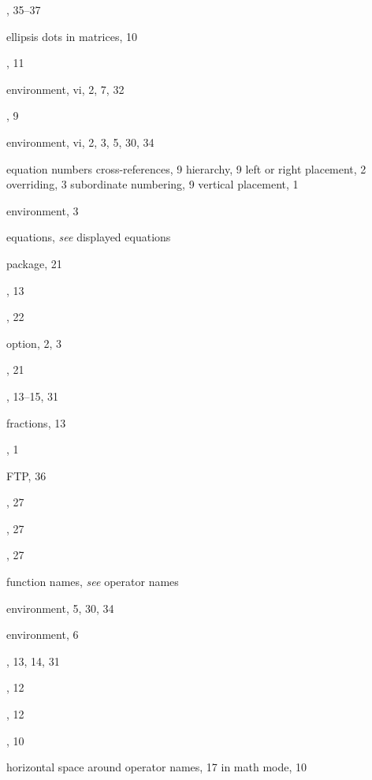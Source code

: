 \documentclass[leqno,titlepage,openany]{amsldoc}
\providecommand{\see}[2]{\textit{see} #1}
\begin{document}
\begin{theindex}
  \indexspace

  \item {}, 35--37
  \item ellipsis dots
    \subitem in matrices, 10
  \item {}, 11
  \item {} environment, vi, 2, 7, 32
  \item {}, 9
  \item {} environment, vi, 2, 3, 5, 30, 34
  \item equation numbers
    \subitem cross-references, 9
    \subitem hierarchy, 9
    \subitem left or right placement, 2
    \subitem overriding, 3
    \subitem subordinate numbering, 9
    \subitem vertical placement, 1
  \item {} environment, 3
  \item equations, \see{displayed equations}{2}
  \item {} package, 21

  \indexspace

  \item {}, 13
  \item {}, 22
  \item {} option, 2, 3
  \item {}, 21
  \item {}, 13--15, 31
  \item fractions, 13
  \item {}, 1
  \item FTP, 36
  \item {}, 27
  \item {}, 27
  \item {}, 27
  \item function names, \see{operator names}{17}

  \indexspace

  \item {} environment, 5, 30, 34
  \item {} environment, 6
  \item {}, 13, 14, 31

  \indexspace

  \item {}, 12
  \item {}, 12
  \item {}, 10
  \item horizontal space
    \subitem around operator names, 17
    \subitem in math mode, 10


\end{theindex}
\end{document}

